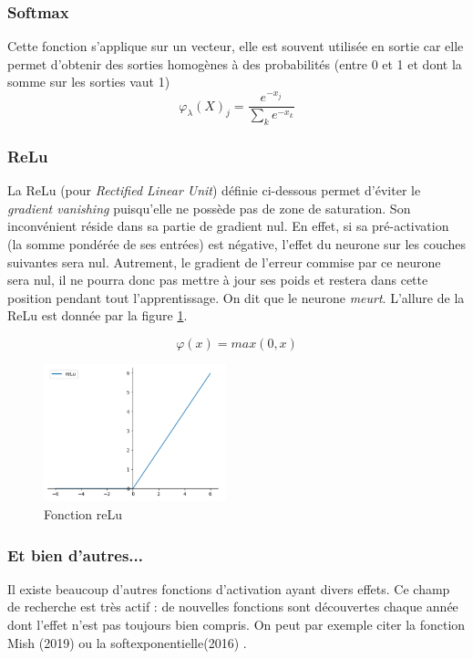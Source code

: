 \subsubsection{Softmax}
Cette fonction s'applique sur un vecteur, elle est souvent utilisée en sortie car elle permet d'obtenir des sorties homogènes à des probabilités (entre 0 et 1 et dont la somme sur les sorties vaut 1)
\begin{displaymath}
\varphi_\lambda (X)_j = \frac{e^{-x_j}}{\sum\limits_{k}  e^{-x_k}}
\end{displaymath}

\subsubsection{ReLu}
La ReLu (pour \textit{Rectified Linear Unit}) définie ci-dessous permet d'éviter le \textit{gradient vanishing} puisqu'elle ne possède pas de zone de saturation. Son inconvénient réside dans sa partie de gradient nul. En effet, si sa pré-activation (la somme pondérée de ses entrées) est négative, l'effet du neurone sur les couches suivantes sera nul. Autrement, le gradient de l'erreur commise par ce neurone sera nul, il ne pourra donc pas mettre à jour ses poids et restera dans cette position pendant tout l'apprentissage. On dit que le neurone \textit{meurt}. L'allure de la ReLu est donnée par la figure \ref{ReLu}.

\begin{displaymath}
\varphi (x) = max(0,x)
\end{displaymath}

\begin{figure}[!h]
\centering
\includegraphics[width=150pt]{"images/MLP/reLu2"}
\caption{Fonction reLu}
\label{ReLu}
\end{figure}

\subsubsection{Et bien d'autres...}
Il existe beaucoup d'autres fonctions d'activation ayant divers effets. Ce champ de recherche est très actif : de nouvelles fonctions sont découvertes chaque année dont l'effet n'est pas toujours bien compris. On peut par exemple citer la fonction Mish (2019) \cite{misra_mish_2019-1} ou la softexponentielle(2016)  \cite{godfrey_continuum_2016}.

